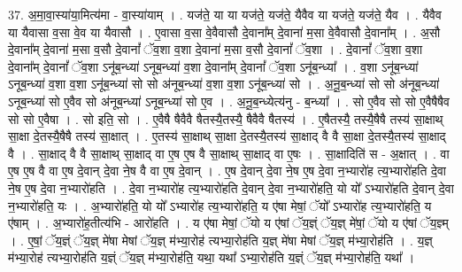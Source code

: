\documentclass[17pt]{extarticle}
\begin{document}
37. अ॒मा॒वा॒स्या॑या॒मित्य॑मा - वा॒स्या॑याम् । . यज॑ते॒ या या यज॑ते॒ यज॑ते॒ यैवैव या यज॑ते॒ यज॑ते॒ यैव । . यैवैव या यैवासा व॒सा वे॒व या यैवासौ । . ए॒वासा व॒सा वे॒वैवासौ दे॒वाना᳚म् दे॒वाना॑ म॒सा वे॒वैवासौ दे॒वाना᳚म् । . अ॒सौ दे॒वाना᳚म् दे॒वाना॑ म॒सा व॒सौ दे॒वानां᳚ ॅव॒शा व॒शा दे॒वाना॑ म॒सा व॒सौ दे॒वानां᳚ ॅव॒शा । . दे॒वानां᳚ ॅव॒शा व॒शा दे॒वाना᳚म् दे॒वानां᳚ ॅव॒शा ऽनू॑ब॒न्ध्या॑ ऽनूब॒न्ध्या॑ व॒शा दे॒वाना᳚म् दे॒वानां᳚ ॅव॒शा ऽनू॑ब॒न्ध्या᳚ । . व॒शा ऽनू॑ब॒न्ध्या॑ ऽनूब॒न्ध्या॑ व॒शा व॒शा ऽनू॑ब॒न्ध्या॑ सो सो अ॑नूब॒न्ध्या॑ व॒शा व॒शा ऽनू॑ब॒न्ध्या॑ सो । . अ॒नू॒ब॒न्ध्या॑ सो सो अ॑नूब॒न्ध्या॑ ऽनूब॒न्ध्या॑ सो ए॒वैव सो अ॑नूब॒न्ध्या॑ ऽनूब॒न्ध्या॑ सो ए॒व । . अ॒नू॒ब॒न्ध्येत्य॑नु - ब॒न्ध्या᳚ । . सो ए॒वैव सो सो ए॒वैषैषैव सो सो ए॒वैषा । . सो इति॒ सो । . ए॒वैषै षैवैवै षैतस्यै॒तस्यै॒ षैवैवै षैतस्य॑ । . ए॒षैतस्यै॒ तस्यै॒षैषै तस्य॑ सा॒क्षाथ् सा॒क्षा दे॒तस्यै॒षैषै तस्य॑ सा॒क्षात् । . ए॒तस्य॑ सा॒क्षाथ् सा॒क्षा दे॒तस्यै॒तस्य॑ सा॒क्षाद् वै वै सा॒क्षा दे॒तस्यै॒तस्य॑ सा॒क्षाद् वै । . सा॒क्षाद् वै वै सा॒क्षाथ् सा॒क्षाद् वा ए॒ष ए॒ष वै सा॒क्षाथ् सा॒क्षाद् वा ए॒षः । . सा॒क्षादिति॑ स - अ॒क्षात् । . वा ए॒ष ए॒ष वै वा ए॒ष दे॒वान् दे॒वा ने॒ष वै वा ए॒ष दे॒वान् । . ए॒ष दे॒वान् दे॒वा ने॒ष ए॒ष दे॒वा न॒भ्यारो॑ह त्य॒भ्यारो॑हति दे॒वा ने॒ष ए॒ष दे॒वा न॒भ्यारो॑हति । . दे॒वा न॒भ्यारो॑ह त्य॒भ्यारो॑हति दे॒वान् दे॒वा न॒भ्यारो॑हति॒ यो यो᳚ ऽभ्यारो॑हति दे॒वान् दे॒वा न॒भ्यारो॑हति॒ यः । . अ॒भ्यारो॑हति॒ यो यो᳚ ऽभ्यारो॑ह त्य॒भ्यारो॑हति॒ य ए॑षा मेषां॒ ॅयो᳚ ऽभ्यारो॑ह त्य॒भ्यारो॑हति॒ य ए॑षाम् । . अ॒भ्यारो॑ह॒तीत्य॑भि - आरो॑हति । . य ए॑षा मेषां॒ ॅयो य ए॑षां ॅय॒ज्ञ्ं ॅय॒ज्ञ् मे॑षां॒ ॅयो य ए॑षां ॅय॒ज्ञ्म् । . ए॒षां॒ ॅय॒ज्ञ्ं ॅय॒ज्ञ् मे॑षा मेषां ॅय॒ज्ञ् म॑भ्या॒रोह॑ त्यभ्या॒रोह॑ति य॒ज्ञ् मे॑षा मेषां ॅय॒ज्ञ् म॑भ्या॒रोह॑ति । . य॒ज्ञ् म॑भ्या॒रोह॑ त्यभ्या॒रोह॑ति य॒ज्ञ्ं ॅय॒ज्ञ् म॑भ्या॒रोह॑ति॒ यथा॒ यथा᳚ ऽभ्या॒रोह॑ति य॒ज्ञ्ं ॅय॒ज्ञ् म॑भ्या॒रोह॑ति॒ यथा᳚ । \newline
\pagebreak
{}
\end{document}
